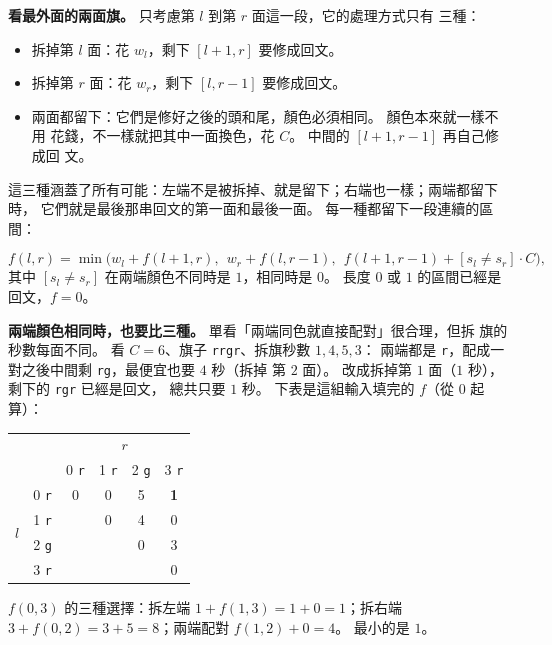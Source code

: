 \textbf{看最外面的兩面旗。} 只考慮第 $l$ 到第 $r$ 面這一段，它的處理方式只有
三種：

\begin{itemize}
\item 拆掉第 $l$ 面：花 $w_l$，剩下 $[l + 1, r]$ 要修成回文。
\item 拆掉第 $r$ 面：花 $w_r$，剩下 $[l, r - 1]$ 要修成回文。
\item 兩面都留下：它們是修好之後的頭和尾，顏色必須相同。 顏色本來就一樣不用
花錢，不一樣就把其中一面換色，花 $C$。 中間的 $[l + 1, r - 1]$ 再自己修成回
文。
\end{itemize}

這三種涵蓋了所有可能：左端不是被拆掉、就是留下；右端也一樣；兩端都留下時，
它們就是最後那串回文的第一面和最後一面。 每一種都留下一段連續的區間：

\begin{center}
\end{center}

\[
f(l, r) = \min\bigl(w_l + f(l + 1, r),\ \ w_r + f(l, r - 1),\ \ f(l + 1, r - 1) + [s_l \ne s_r] \cdot C\bigr),
\]
其中 $[s_l \ne s_r]$ 在兩端顏色不同時是 $1$，相同時是 $0$。 長度 $0$ 或
$1$ 的區間已經是回文，$f = 0$。

\textbf{兩端顏色相同時，也要比三種。} 單看「兩端同色就直接配對」很合理，但拆
旗的秒數每面不同。 看 $C = 6$、旗子 \texttt{rrgr}、拆旗秒數 $1, 4, 5, 3$：
兩端都是 \texttt{r}，配成一對之後中間剩 \texttt{rg}，最便宜也要 $4$ 秒（拆掉
第 $2$ 面）。 改成拆掉第 $1$ 面（$1$ 秒），剩下的 \texttt{rgr} 已經是回文，
總共只要 $1$ 秒。 下表是這組輸入填完的 $f$（從 $0$ 起算）：

\begin{center}
\begin{tabular}{cc|cccc}
\toprule
 & & \multicolumn{4}{c}{$r$} \\
 & & 0 \texttt{r} & 1 \texttt{r} & 2 \texttt{g} & 3 \texttt{r} \\
\midrule
\multirow{4}{*}{$l$} & 0 \texttt{r} & 0 & 0 & 5 & \textbf{1} \\
 & 1 \texttt{r} & & 0 & 4 & 0 \\
 & 2 \texttt{g} & & & 0 & 3 \\
 & 3 \texttt{r} & & & & 0 \\
\bottomrule
\end{tabular}
\end{center}

$f(0, 3)$ 的三種選擇：拆左端 $1 + f(1, 3) = 1 + 0 = 1$；拆右端
$3 + f(0, 2) = 3 + 5 = 8$；兩端配對 $f(1, 2) + 0 = 4$。 最小的是 $1$。


